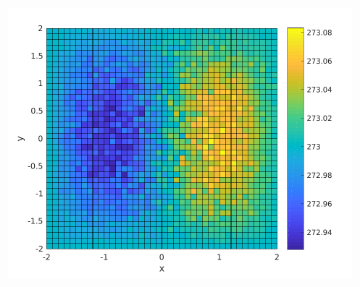\begin{frame}
\begin{figure}
\begin{subfigure}[t]{0.5\textwidth}
    \end{subfigure}%
    ~ 
    \begin{subfigure}[t]{0.5\textwidth}
        \centering
        \includegraphics[width=0.71\linewidth]{../../results/simulations/10000/solution_2D/solution_2D_sim10000_step01_time250_boundary2.pdf}
    \end{subfigure}
\end{figure}
\end{frame}

